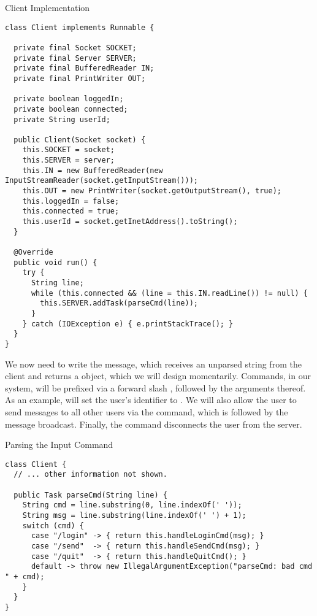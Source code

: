 \begin{cl}{Client Implementation}
\begin{lstlisting}[language=MyJava]
class Client implements Runnable {

  private final Socket SOCKET;
  private final Server SERVER;
  private final BufferedReader IN;
  private final PrintWriter OUT;

  private boolean loggedIn;
  private boolean connected;
  private String userId;

  public Client(Socket socket) {
    this.SOCKET = socket;
    this.SERVER = server;
    this.IN = new BufferedReader(new InputStreamReader(socket.getInputStream()));
    this.OUT = new PrintWriter(socket.getOutputStream(), true);
    this.loggedIn = false;
    this.connected = true;
    this.userId = socket.getInetAddress().toString();
  }

  @Override
  public void run() {
    try {
      String line;
      while (this.connected && (line = this.IN.readLine()) != null) { 
        this.SERVER.addTask(parseCmd(line)); 
      }
    } catch (IOException e) { e.printStackTrace(); }
  }
}
\end{lstlisting}
\end{cl}

We now need to write the  message, which receives an unparsed string from the client and returns a  object, which we will design momentarily. Commands, in our system, will be prefixed via a forward slash \ttt{/}, followed by the arguments thereof. As an example,  will set the user's identifier to . We will also allow the user to send messages to all other users via the  command, which is followed by the message broadcast. Finally, the  command disconnects the user from the server.

\begin{cl}{Parsing the Input Command}
\begin{lstlisting}[language=MyJava]
class Client {
  // ... other information not shown.

  public Task parseCmd(String line) {
    String cmd = line.substring(0, line.indexOf(' '));
    String msg = line.substring(line.indexOf(' ') + 1);
    switch (cmd) {
      case "/login" -> { return this.handleLoginCmd(msg); }
      case "/send"  -> { return this.handleSendCmd(msg); }
      case "/quit"  -> { return this.handleQuitCmd(); }
      default -> throw new IllegalArgumentException("parseCmd: bad cmd " + cmd);
    }
  }
}
\end{lstlisting}
\end{cl}

